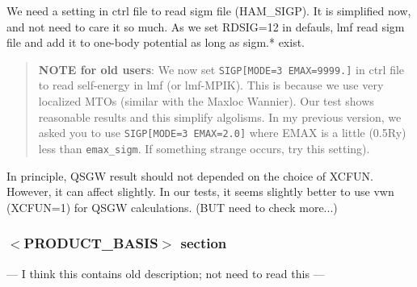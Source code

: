 \documentclass[a4paper,10pt,epsf,fleqn]{article}
\begin{document}
We need a setting in ctrl file to read sigm file (HAM\_SIGP). 
It is simplified now, and not need to care it so much.
As we set RDSIG=12 in defauls, lmf read sigm file and add it to one-body
potential as long as sigm.* exist.\\

\begin{quote}
{\bf NOTE for old users}: We now set \verb+SIGP[MODE=3 EMAX=9999.]+
in ctrl file to read self-energy in lmf (or lmf-MPIK). 
This is because we use very localized MTOs (similar with the Maxloc Wannier).
Our test shows reasonable results and this simplify algolisms.
In my previous version, we asked you to use \verb+SIGP[MODE=3 EMAX=2.0]+
where EMAX is a little (0.5Ry) less than \verb+emax_sigm+. If something
strange occurs, try this setting).
\end{quote}

In principle, QSGW result should not depended on the choice of XCFUN.
However, it can affect slightly. In our tests, it seems slightly better
to use vwn (XCFUN=1) for QSGW calculations. (BUT need to check more...)



\subsubsection{$<$PRODUCT\_BASIS$>$ section}
--- I think this contains old description; not need to read this ---\\
\end{document}
